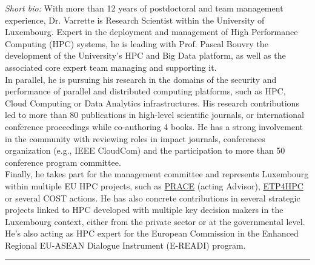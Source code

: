 \documentclass{cv}
\begin{document}
\emph{Short bio:}
With more than 12 years of postdoctoral and team management experience, Dr. Varrette is Research Scientist within the University of Luxembourg.
Expert in the deployment and management of High Performance Computing (HPC) systems, he is leading with Prof. Pascal Bouvry the development of the University’s HPC and Big Data platform, as well as the associated core expert team managing and supporting it.\\
In parallel, he is pursuing his research in the domains of the security and performance of parallel and distributed computing platforms, such as HPC, Cloud Computing or Data Analytics infrastructures.
His research contributions led to more than 80 publications in high-level scientific journals, or international conference proceedings while co-authoring 4 books. He has a strong involvement in the community with reviewing roles in impact journals, conferences organization (e.g., IEEE CloudCom) and the participation to more than 50 conference program committee.\\
Finally, he takes part for the management committee and represents Luxembourg within multiple EU HPC projects, such as \href{http://www.prace-ri.eu/}{PRACE} (acting Advisor), \href{http://www.etp4hpc.eu/}{ETP4HPC} or several COST actions. He has also concrete contributions in several strategic projects linked to HPC developed with multiple key decision makers in the Luxembourg context, either from the private sector or at the governmental level. He's also acting as HPC expert for the European Commission in the Enhanced Regional EU-ASEAN Dialogue Instrument (E-READI) program.





\noindent\rule{\textwidth}{0.4pt}
\end{document}
